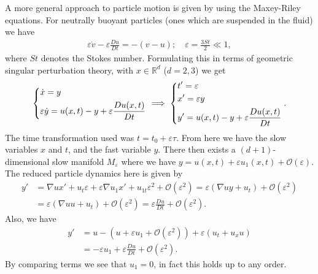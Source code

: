 \begin{ex}
A more general approach to particle motion is given by \cite{Sapsis2008} using the Maxey-Riley equations. For neutrally buoyant particles (ones which are suspended in the fluid) we have
\begin{align}
	\varepsilon \dot{v} - \varepsilon \frac{Du}{Dt} = -(v-u);\quad \varepsilon = \frac{3St}{2}\ll 1, \label{eq9:maxeyriley}	
\end{align}
where $St$ denotes the Stokes number. Formulating this in terms of geometric singular perturbation theory, with $x \in \mathbb{R}^{d}$ ($d=2,3$) we get
\begin{align}
	\begin{dcases}
		\dot{x} = y\\
		\varepsilon \dot{y} = u(x,t) - y + \varepsilon \frac{Du(x,t)}{Dt}	
	\end{dcases}
\implies
\begin{dcases}
	t' = \varepsilon \\
	x' = \varepsilon y \\
	y' = u(x,t) - y + \varepsilon \frac{Du(x,t)}{Dt}
\end{dcases}
.
\end{align}
The time transformation used was $t = t_0 + \varepsilon \tau$. From here we have the slow variables $x$ and $t$, and the fast variable $y$. There then exists a $(d+1)$-dimensional slow manifold $M_\varepsilon$ where we have $y = u(x,t) + \varepsilon u_1(x,t) + \mathcal{O}(\varepsilon)$. The reduced particle dynamics here is given by
\begin{align}
	y' &= \nabla u x' + u_t \varepsilon + \varepsilon \nabla u_1 x' + u_{1t}\varepsilon^{2} + \mathcal{O}(\varepsilon^{2}) 
	= \varepsilon(\nabla uy + u_{t}) + \mathcal{O}(\varepsilon^{2}) \\
	   &= \varepsilon (\nabla u u + u_{t}) + \mathcal{O}(\varepsilon^{2}) 
	   = \varepsilon \frac{Du}{Dt} + \mathcal{O}(\varepsilon^{2}).
\end{align}
Also, we have 
\begin{align}
	y' &= u - \left( u + \varepsilon u_{1} + \mathcal{O}(\varepsilon^{2}) \right) + \varepsilon \left( u_{t} + u_{x}u \right) \\
	   &=-\varepsilon u_{1} + \varepsilon \frac{Du}{Dt} + \mathcal{O}(\varepsilon^{2}).
\end{align}
By  comparing terms we see that $u_{1} =0$, in fact this holds up to any order. 


\end{ex}

